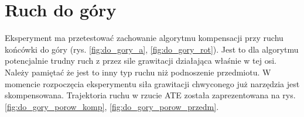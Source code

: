 

\section{Ruch do góry}

Eksperyment ma przetestować zachowanie algorytmu kompensacji przy ruchu końcówki do góry (rys. \ref{fig:do_gory_a}, \ref{fig:do_gory_rot}). Jest to dla algorytmu potencjalnie trudny ruch z przez sile grawitacji działająca właśnie w tej osi. Należy pamiętać że jest to inny typ ruchu niż podnoszenie przedmiotu. W momencie rozpoczęcia eksperymentu siła grawitacji chwyconego już narzędzia jest skompensowana. Trajektoria ruchu w rzucie ATE została zaprezentowana na rys. \ref{fig:do_gory_porow_komp}, \ref{fig:do_gory_porow_przedm}.

